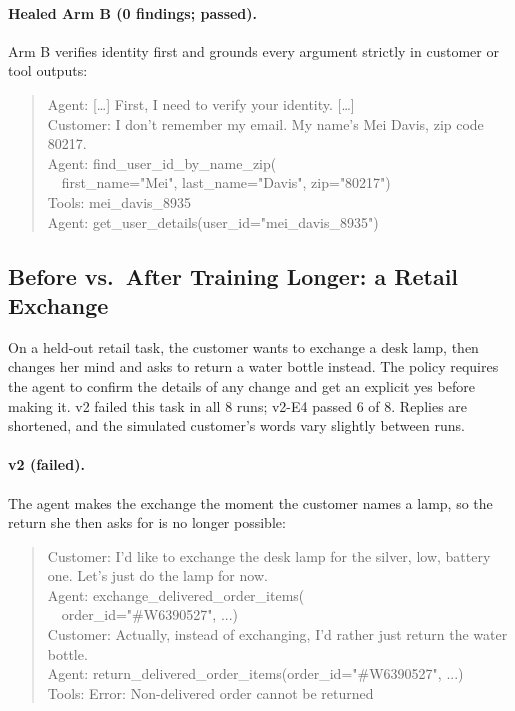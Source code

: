 \documentclass[11pt]{article}
\begin{document}
\paragraph{Healed Arm B (0 findings; passed).}
Arm B verifies identity first and grounds every argument strictly in customer or tool outputs:
\begin{quote}\scriptsize\ttfamily\raggedright\sloppy
Agent: [\ldots] First, I need to verify your identity. [\ldots]\\
Customer: I don't remember my email. My name's Mei Davis, zip code 80217.\\
Agent: find\_user\_id\_by\_name\_zip(\\
\ \ first\_name="Mei", last\_name="Davis", zip="80217")\\
Tools: mei\_davis\_8935\\
Agent: get\_user\_details(user\_id="mei\_davis\_8935")
\end{quote}


\subsection{Before vs.\ After Training Longer: a Retail Exchange}
On a held-out retail task, the customer wants to exchange a desk lamp, then changes her mind and asks to return a water bottle instead. The policy requires the agent to confirm the details of any change and get an explicit yes before making it. v2 failed this task in all 8 runs; v2-E4 passed 6 of 8. Replies are shortened, and the simulated customer's words vary slightly between runs.

\paragraph{v2 (failed).} The agent makes the exchange the moment the customer names a lamp, so the return she then asks for is no longer possible:
\begin{quote}\scriptsize\ttfamily\raggedright\sloppy
Customer: I'd like to exchange the desk lamp for the silver, low, battery one. Let's just do the lamp for now.\\
Agent: exchange\_delivered\_order\_items(\\
\ \ order\_id="\#W6390527", ...)\\
Customer: Actually, instead of exchanging, I'd rather just return the water bottle.\\
Agent: return\_delivered\_order\_items(order\_id="\#W6390527", ...)\\
Tools: Error: Non-delivered order cannot be returned
\end{quote}
\end{document}
